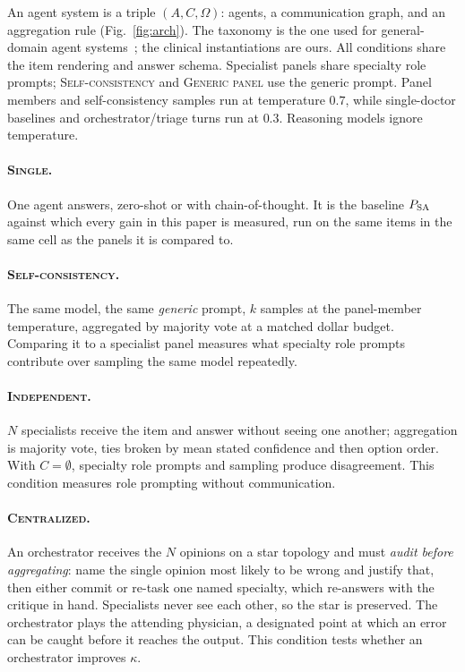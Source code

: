 An agent system is a triple $(A, C, \Omega)$: agents, a communication graph, and an aggregation
rule (Fig.~\ref{fig:arch}). The taxonomy is the one used for general-domain agent
systems~\citep{kim2026scaling}; the clinical instantiations are ours. All conditions share
the item rendering and answer schema. Specialist panels share specialty role prompts;
\textsc{Self-consistency} and \textsc{Generic panel} use the generic prompt. Panel members and
self-consistency samples run at temperature $0.7$, while single-doctor baselines and
orchestrator/triage turns run at $0.3$. Reasoning models ignore temperature.

\paragraph{\textsc{Single}.} One agent answers, zero-shot or with chain-of-thought. It is the baseline
$P_{\mathrm{SA}}$ against which every gain in this paper is measured, run on the same items in the same
cell as the panels it is compared to.

\paragraph{\textsc{Self-consistency}.} The same model, the same \emph{generic} prompt, $k$ samples
at the panel-member temperature, aggregated by majority vote at a matched dollar budget.
Comparing it to a specialist panel measures what specialty role prompts contribute over
sampling the same model repeatedly.

\paragraph{\textsc{Independent}.} $N$ specialists receive the item and answer without seeing one
another; aggregation is majority vote, ties broken by mean stated confidence and then option
order. With $C = \emptyset$, specialty role prompts and sampling produce disagreement.
This condition measures role prompting without communication.

\paragraph{\textsc{Centralized}.} An orchestrator receives the $N$ opinions on a star topology
and must \emph{audit before aggregating}: name the single opinion most likely to be wrong and
justify that, then either commit or re-task one named specialty, which re-answers with the
critique in hand. Specialists never see each other, so the star is preserved. The orchestrator
plays the attending physician, a designated point at which an error can be caught before it
reaches the output. This condition tests whether an orchestrator improves $\kappa$.

